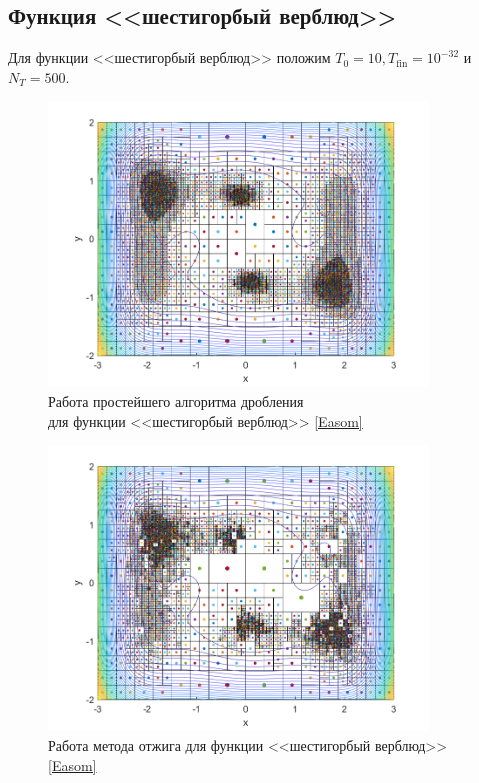 \subsection{Функция <<шестигорбый верблюд>>}
Для функции <<шестигорбый верблюд>> положим $T_0=10, T_{\mathrm{fin}}=10^{-32}$ и $N_T=500$.\begin{figure}[H]
\centering
\includegraphics[width=0.9\textwidth]{Graphics/TrivialDivide_Camel_algo.png}
\caption{Работа простейшего алгоритма дробления \\ для функции <<шестигорбый верблюд>> \eqref{Easom}} 
\end{figure}
\begin{figure}[H]
\centering
\includegraphics[width=0.9\textwidth]{Graphics/SimAnnealing_Camel_algo.png}
\caption{Работа метода отжига для функции <<шестигорбый верблюд>> \eqref{Easom}} 
\end{figure}
